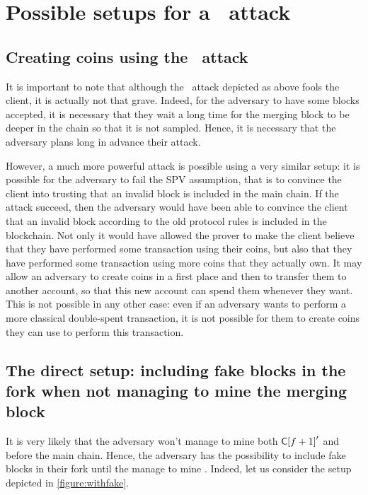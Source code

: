 \section[Possible setups]{Possible setups for a \cs\ attack}
    \subsection{Creating coins using the \cs\ attack}
    It is important to note that although the \cs\ attack depicted as above fools the client, it is actually not that grave. Indeed, for the adversary to have some blocks accepted, it is necessary that they wait a long time for the merging block to be deeper in the chain so that it is not sampled. Hence, it is necessary that the adversary plans long in advance their attack.
    
    However, a much more powerful attack is possible using a very similar setup: it is possible for the adversary to fail the SPV assumption, that is to convince the client into trusting that an invalid block is included in the main chain. If the attack succeed, then the adversary would have been able to convince the client that an invalid block according to the old protocol rules is included in the blockchain. Not only it would have allowed the prover to make the client believe that they have performed some transaction using their coins, but also that they have performed some transaction using more coins that they actually own. It may allow an adversary to create coins in a first place and then to transfer them to another account, so that this new account can spend them whenever they want. This is not possible in any other case: even if an adversary wants to perform a more classical double-spent transaction, it is not possible for them to create coins they can use to perform this transaction.
    
    \subsection{The direct setup: including fake blocks in the fork when not managing to mine the merging block}
    It is very likely that the adversary won't manage to mine both \(\mathsf{C[}f+1\mathsf{]}'\) and  before the main chain. Hence, the adversary has the possibility to include fake blocks in their fork until the manage to mine . Indeed, let us consider the setup depicted in \autoref{figure:withfake}.
    
